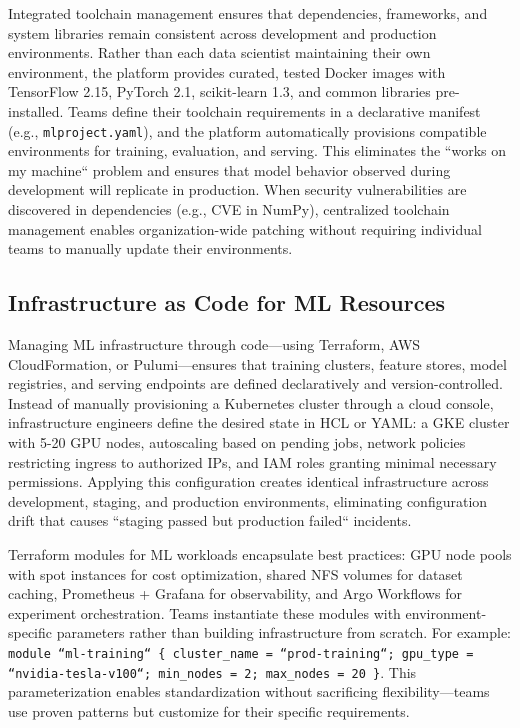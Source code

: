 Integrated toolchain management ensures that dependencies, frameworks, and system libraries remain consistent across development and production environments. Rather than each data scientist maintaining their own environment, the platform provides curated, tested Docker images with TensorFlow 2.15, PyTorch 2.1, scikit-learn 1.3, and common libraries pre-installed. Teams define their toolchain requirements in a declarative manifest (e.g., \texttt{mlproject.yaml}), and the platform automatically provisions compatible environments for training, evaluation, and serving. This eliminates the ``works on my machine`` problem and ensures that model behavior observed during development will replicate in production. When security vulnerabilities are discovered in dependencies (e.g., CVE in NumPy), centralized toolchain management enables organization-wide patching without requiring individual teams to manually update their environments.

\subsection{Infrastructure as Code for ML Resources}

Managing ML infrastructure through code---using Terraform, AWS CloudFormation, or Pulumi---ensures that training clusters, feature stores, model registries, and serving endpoints are defined declaratively and version-controlled. Instead of manually provisioning a Kubernetes cluster through a cloud console, infrastructure engineers define the desired state in HCL or YAML: a GKE cluster with 5-20 GPU nodes, autoscaling based on pending jobs, network policies restricting ingress to authorized IPs, and IAM roles granting minimal necessary permissions. Applying this configuration creates identical infrastructure across development, staging, and production environments, eliminating configuration drift that causes ``staging passed but production failed`` incidents.

Terraform modules for ML workloads encapsulate best practices: GPU node pools with spot instances for cost optimization, shared NFS volumes for dataset caching, Prometheus + Grafana for observability, and Argo Workflows for experiment orchestration. Teams instantiate these modules with environment-specific parameters rather than building infrastructure from scratch. For example: \texttt{module ``ml-training`` \{ cluster\_name = ``prod-training``; gpu\_type = ``nvidia-tesla-v100``; min\_nodes = 2; max\_nodes = 20 \}}. This parameterization enables standardization without sacrificing flexibility---teams use proven patterns but customize for their specific requirements.

